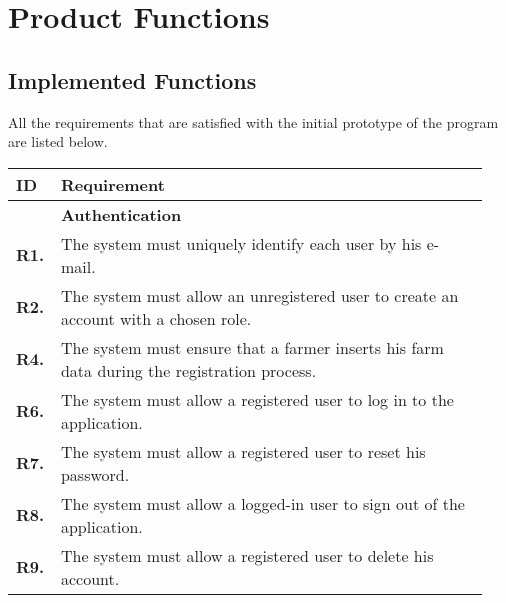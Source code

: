 \chapter{Product Functions} \label{ch:product_functions}

\section{Implemented Functions}

All the requirements that are satisfied with the initial prototype of the program are listed below. 

\begin{longtable}{@{}p{0.06\linewidth} p{0.88\linewidth}}
	\toprule
	\textbf{ID}   & \textbf{Requirement}\\
	\midrule
	
	& \textbf{Authentication}\\
    \midrule
	\textbf{R1.} & The system must uniquely identify each user by his e-mail. \\
	\textbf{R2.} & The system must allow an unregistered user to create an account with a chosen role. \\
	\textbf{R4.} & The system must ensure that a farmer inserts his farm data during the registration process.\\
	\textbf{R6.} & The system must allow a registered user to log in to the application. \\
	\textbf{R7.} & The system must allow a registered user to reset his password. \\
	\textbf{R8.} & The system must allow a logged-in user to sign out of the application. \\
	\textbf{R9.} & The system must allow a registered user to delete his account. \\
    \midrule


\end{longtable}
